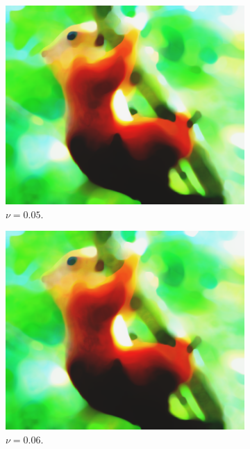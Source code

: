 \documentclass[abstracton]{scrreprt}
\begin{document}
\begin{figure}[!ht]
\begin{subfigure}[b]{0.16\textwidth}
                    \includegraphics[width=\textwidth]{img/segmentation/cr/005squirrel.png}
                    \caption{$\nu = 0.05$.}
                \end{subfigure}
                \begin{subfigure}[b]{0.16\textwidth}
                    \includegraphics[width=\textwidth]{img/segmentation/cr/006squirrel.png}
                    \caption{$\nu = 0.06$.}
                \end{subfigure}
                \begin{subfigure}[b]{0.16\textwidth}

\end{subfigure}
\end{figure}
\end{document}
